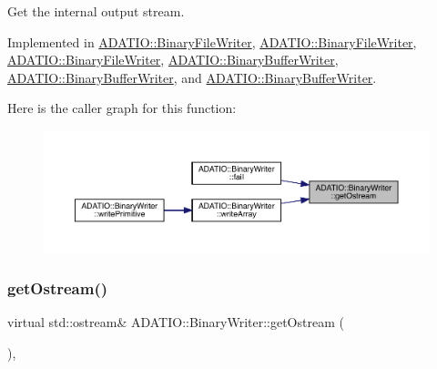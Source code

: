 Get the internal output stream. 



Implemented in \mbox{\hyperlink{classADATIO_1_1BinaryFileWriter_a2506200a774d4823088a0365e0452d9a}{A\+D\+A\+T\+I\+O\+::\+Binary\+File\+Writer}}, \mbox{\hyperlink{classADATIO_1_1BinaryFileWriter_a2506200a774d4823088a0365e0452d9a}{A\+D\+A\+T\+I\+O\+::\+Binary\+File\+Writer}}, \mbox{\hyperlink{classADATIO_1_1BinaryFileWriter_a2506200a774d4823088a0365e0452d9a}{A\+D\+A\+T\+I\+O\+::\+Binary\+File\+Writer}}, \mbox{\hyperlink{classADATIO_1_1BinaryBufferWriter_a587ce48f0cf6dd4064edde6db836c0a3}{A\+D\+A\+T\+I\+O\+::\+Binary\+Buffer\+Writer}}, \mbox{\hyperlink{classADATIO_1_1BinaryBufferWriter_a587ce48f0cf6dd4064edde6db836c0a3}{A\+D\+A\+T\+I\+O\+::\+Binary\+Buffer\+Writer}}, and \mbox{\hyperlink{classADATIO_1_1BinaryBufferWriter_a587ce48f0cf6dd4064edde6db836c0a3}{A\+D\+A\+T\+I\+O\+::\+Binary\+Buffer\+Writer}}.

Here is the caller graph for this function\+:
\nopagebreak
\begin{figure}[H]
\begin{center}
\leavevmode
\includegraphics[width=350pt]{db/dee/classADATIO_1_1BinaryWriter_a4fe227341d17d012bb83a070c208dac0_icgraph}
\end{center}
\end{figure}
\mbox{\label{classADATIO_1_1BinaryWriter_a4fe227341d17d012bb83a070c208dac0}} 
\subsubsection{\texorpdfstring{getOstream()}{getOstream()}\hspace{0.1cm}{\footnotesize\ttfamily [2/3]}}
{\footnotesize\ttfamily virtual std\+::ostream\& A\+D\+A\+T\+I\+O\+::\+Binary\+Writer\+::get\+Ostream (\begin{DoxyParamCaption}{ }\end{DoxyParamCaption})\hspace{0.3cm}{\ttfamily [protected]}, {}}




